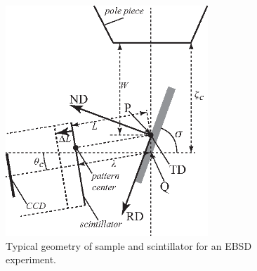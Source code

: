 \documentclass[DIV=calc, paper=letter, fontsize=11pt]{scrartcl}	 %
\begin{document}
\begin{figure}[t]
\centering
\includegraphics[width=3in]{figs/geometry}
\caption{Typical geometry of sample and scintillator for an EBSD experiment.} \label{fig:geometry}
\end{figure}
\end{document}
